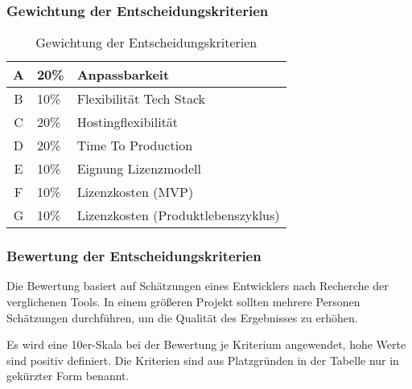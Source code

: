 \subsubsection{Gewichtung der Entscheidungskriterien}
\begin{table}[h]
    \begin{center}
        \begin{tabular}{|c|l|l|}
            \hline
            A & 20\% & Anpassbarkeit                      \\ \hline
            B & 10\% & Flexibilität Tech Stack            \\ \hline
            C & 20\% & Hostingflexibilität                \\ \hline
            D & 20\% & Time To Production                 \\ \hline
            E & 10\% & Eignung Lizenzmodell               \\ \hline
            F & 10\% & Lizenzkosten (MVP)                 \\ \hline
            G & 10\% & Lizenzkosten (Produktlebenszyklus) \\ \hline
        \end{tabular}
    \end{center}
    \caption{Gewichtung der Entscheidungskriterien}
    \label{tab:gewichtung-der-entscheidungskriterien}
\end{table}

\newpage

\subsubsection{Bewertung der Entscheidungskriterien}
Die Bewertung basiert auf Schätzungen eines Entwicklers nach Recherche der verglichenen Tools.
In einem größeren Projekt sollten mehrere Personen Schätzungen durchführen, um die Qualität des Ergebnisses zu erhöhen.

Es wird eine 10er-Skala bei der Bewertung je Kriterium angewendet, hohe Werte sind positiv definiert.
Die Kriterien sind aus Platzgründen in der Tabelle nur in gekürzter Form benannt.


